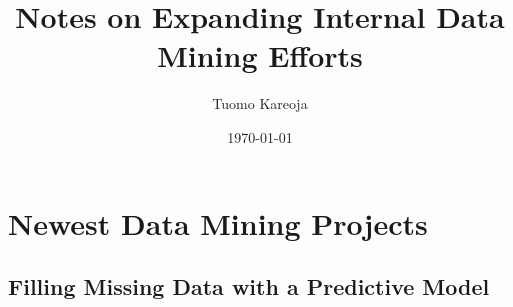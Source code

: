 \documentclass[10pt]{beamer}
\title[Data Science in Blackwell]{Notes on Expanding Internal Data Mining Efforts} %
\author{Tuomo Kareoja} %
\institute[Blackwell] %
{
Blackwell \\ %
\medskip
}
\date{\today} %
\begin{document}
\begin{frame}
\titlepage %
\end{frame}



\section{Newest Data Mining Projects} %

\subsection{Filling Missing Data with a Predictive Model} %
\end{document}
